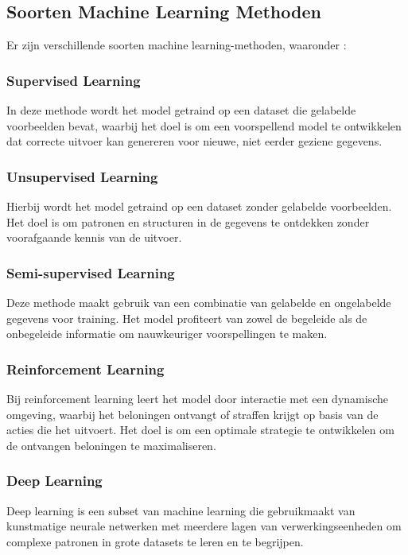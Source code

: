 \subsection{Soorten Machine Learning Methoden}

Er zijn verschillende soorten machine learning-methoden, waaronder \autocite{Mahesh2019}:

\subsubsection{Supervised Learning}
In deze methode wordt het model getraind op een dataset die gelabelde voorbeelden bevat, waarbij het doel is om een voorspellend model te ontwikkelen dat correcte uitvoer kan genereren voor nieuwe, niet eerder geziene gegevens.

\subsubsection{Unsupervised Learning}
Hierbij wordt het model getraind op een dataset zonder gelabelde voorbeelden. Het doel is om patronen en structuren in de gegevens te ontdekken zonder voorafgaande kennis van de uitvoer.

\subsubsection{Semi-supervised Learning}
Deze methode maakt gebruik van een combinatie van gelabelde en ongelabelde gegevens voor training. Het model profiteert van zowel de begeleide als de onbegeleide informatie om nauwkeuriger voorspellingen te maken.

\subsubsection{Reinforcement Learning}
Bij reinforcement learning leert het model door interactie met een dynamische omgeving, waarbij het beloningen ontvangt of straffen krijgt op basis van de acties die het uitvoert. Het doel is om een optimale strategie te ontwikkelen om de ontvangen beloningen te maximaliseren\autocite{Mahesh2019}.

\subsubsection{Deep Learning}
Deep learning is een subset van machine learning die gebruikmaakt van kunstmatige neurale netwerken met meerdere lagen van verwerkingseenheden om complexe patronen in grote datasets te leren en te begrijpen.\\

